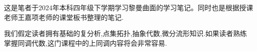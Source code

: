 \documentclass{package/fancy-book}
\begin{document}

\tableofcontents

\quad
\newpage
这是笔者于2024年本科四年级下学期学习黎曼曲面的学习笔记。同时也是根据授课老师王嘉项老师的课堂板书整理的笔记.

我们假定读者拥有基础的复分析,点集拓扑,抽象代数,微分流形知识.如果读者熟练掌握同调代数,这门课程中的上同调内容将会非常容易.





\end{document}
